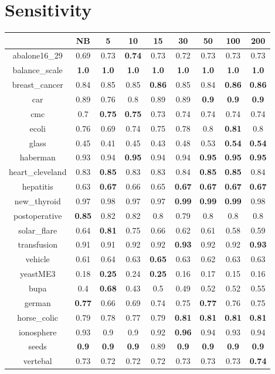 \documentclass{article}%
\begin{document}
%
\section*{Sensitivity}%
\begin{tabular}{c|cccccccc}%
\hline%
&NB&5&10&15&30&50&100&200\\%
\hline%
abalone16\_29&0.69&0.73&\textbf{0.74}&0.73&0.72&0.73&0.73&0.73\\%
\hline%
balance\_scale&\textbf{1.0}&\textbf{1.0}&\textbf{1.0}&\textbf{1.0}&\textbf{1.0}&\textbf{1.0}&\textbf{1.0}&\textbf{1.0}\\%
\hline%
breast\_cancer&0.84&0.85&0.85&\textbf{0.86}&0.85&0.84&\textbf{0.86}&\textbf{0.86}\\%
\hline%
car&0.89&0.76&0.8&0.89&0.89&\textbf{0.9}&\textbf{0.9}&\textbf{0.9}\\%
\hline%
cmc&0.7&\textbf{0.75}&\textbf{0.75}&0.73&0.74&0.74&0.74&0.74\\%
\hline%
ecoli&0.76&0.69&0.74&0.75&0.78&0.8&\textbf{0.81}&0.8\\%
\hline%
glass&0.45&0.41&0.45&0.43&0.48&0.53&\textbf{0.54}&\textbf{0.54}\\%
\hline%
haberman&0.93&0.94&\textbf{0.95}&0.94&0.94&\textbf{0.95}&\textbf{0.95}&\textbf{0.95}\\%
\hline%
heart\_cleveland&0.83&\textbf{0.85}&0.83&0.83&0.84&\textbf{0.85}&\textbf{0.85}&0.84\\%
\hline%
hepatitis&0.63&\textbf{0.67}&0.66&0.65&\textbf{0.67}&\textbf{0.67}&\textbf{0.67}&\textbf{0.67}\\%
\hline%
new\_thyroid&0.97&0.98&0.97&0.97&\textbf{0.99}&\textbf{0.99}&\textbf{0.99}&0.98\\%
\hline%
postoperative&\textbf{0.85}&0.82&0.82&0.8&0.79&0.8&0.8&0.8\\%
\hline%
solar\_flare&0.64&\textbf{0.81}&0.75&0.66&0.62&0.61&0.58&0.59\\%
\hline%
transfusion&0.91&0.91&0.92&0.92&\textbf{0.93}&0.92&0.92&\textbf{0.93}\\%
\hline%
vehicle&0.61&0.64&0.63&\textbf{0.65}&0.63&0.62&0.63&0.63\\%
\hline%
yeastME3&0.18&\textbf{0.25}&0.24&\textbf{0.25}&0.16&0.17&0.15&0.16\\%
\hline%
bupa&0.4&\textbf{0.68}&0.43&0.5&0.49&0.52&0.52&0.55\\%
\hline%
german&\textbf{0.77}&0.66&0.69&0.74&0.75&\textbf{0.77}&0.76&0.75\\%
\hline%
horse\_colic&0.79&0.78&0.77&0.79&\textbf{0.81}&\textbf{0.81}&\textbf{0.81}&\textbf{0.81}\\%
\hline%
ionosphere&0.93&0.9&0.9&0.92&\textbf{0.96}&0.94&0.93&0.94\\%
\hline%
seeds&\textbf{0.9}&\textbf{0.9}&\textbf{0.9}&0.89&\textbf{0.9}&\textbf{0.9}&\textbf{0.9}&\textbf{0.9}\\%
\hline%
vertebal&0.73&0.72&0.72&0.72&0.73&0.73&0.73&\textbf{0.74}\\%
\hline%
\end{tabular}
\end{document}
